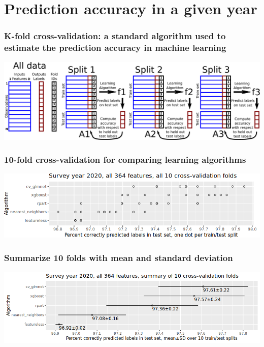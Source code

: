 \documentclass{beamer}
\begin{document}
\section{Prediction accuracy in a given year}

\begin{frame}
  \frametitle{K-fold cross-validation: a standard algorithm used to estimate the prediction accuracy in machine learning}
  \includegraphics[width=\textwidth]{drawing-cross-validation.pdf}
\end{frame}

\begin{frame}
  \frametitle{10-fold cross-validation for comparing learning algorithms}
  \includegraphics[width=\textwidth]{download-nsch-mlr3batchmark-registry-one-set-all-features.png}
\end{frame}

\begin{frame}
  \frametitle{Summarize 10 folds with mean and standard deviation}
  \includegraphics[width=\textwidth]{download-nsch-mlr3batchmark-registry-one-set-all-features-stats.png}
\end{frame}
\end{document}

